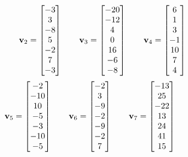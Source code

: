 \begin{tasks}[resume, style=enumerate]
\begin{align*}
    \qquad
    \mathbf v_2 =
    \begin{bmatrix} -3 \\ 3 \\ -8 \\ 5 \\ -2 \\ 7 \\ -3 \end{bmatrix}
    \qquad
    \mathbf v_3 =
    \begin{bmatrix} -20 \\ -12 \\ 4 \\ 0 \\ 16 \\ -6 \\ -8 \end{bmatrix}
    \qquad
    \mathbf v_4 =
    \begin{bmatrix} 6 \\ 1 \\ 3 \\ -1 \\ 10 \\ 7 \\ 4 \end{bmatrix}
  \end{align*}
  \begin{align*}
    &\mathbf v_5 =
    \begin{bmatrix} -2 \\ -10 \\ 10 \\ -5 \\ -3 \\ -10 \\ -5 \end{bmatrix}
    \qquad
    \mathbf v_6 =
    \begin{bmatrix} -2 \\ 3 \\ -9 \\ -2 \\ -9 \\ -2 \\ 7 \end{bmatrix}
    \qquad
    \mathbf v_7 =
    \begin{bmatrix} -13 \\ 25 \\ -22 \\ 13 \\ 24 \\ 41 \\ 15 \end{bmatrix}
  \end{align*}

\end{tasks}
